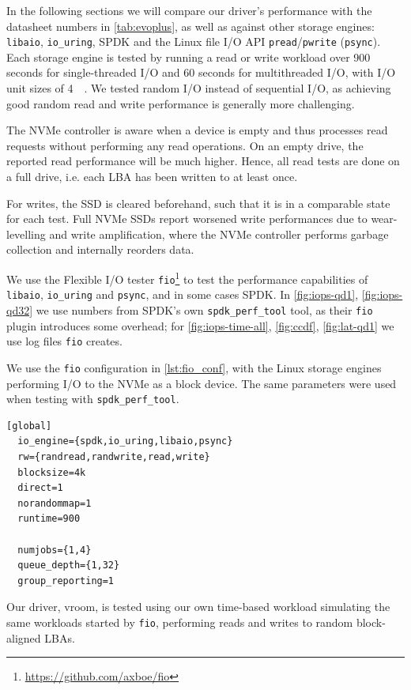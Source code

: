 In the following sections we will compare our driver's performance with the datasheet numbers in \autoref{tab:evoplus}, as well as against other storage engines: \texttt{libaio}, \texttt{io\_uring}, SPDK and the Linux file I/O API \texttt{pread}/\texttt{pwrite} (\texttt{psync}). Each storage engine is tested by running a read or write workload over 900 seconds for single-threaded I/O and 60 seconds for multithreaded I/O, with I/O unit sizes of \qty{4}{\kibi\byte}. We tested random I/O instead of sequential I/O, as achieving good random read and write performance is generally more challenging.

The NVMe controller is aware when a device is empty and thus processes read requests without performing any read operations. On an empty drive, the reported read performance will be much higher. Hence, all read tests are done on a full drive, i.e. each LBA has been written to at least once.

For writes, the SSD is cleared beforehand, such that it is in a comparable state for each test. Full NVMe SSDs report worsened write performances due to wear-levelling and write amplification, where the NVMe controller performs garbage collection and internally reorders data.


  We use the Flexible I/O tester \texttt{fio}\footnote{\url{https://github.com/axboe/fio}} to test the performance capabilities of \texttt{libaio}, \texttt{io\_uring} and \texttt{psync}, and in some cases SPDK. In \autoref{fig:iops-qd1}, \autoref{fig:iops-qd32} we use numbers from SPDK's own \texttt{spdk\_perf\_tool} tool, as their \texttt{fio} plugin introduces some overhead; for \autoref{fig:iops-time-all}, \autoref{fig:ccdf}, \autoref{fig:lat-qd1} we use log files \texttt{fio} creates.

We use the \texttt{fio} configuration in \autoref{lst:fio_conf}, with the Linux storage engines performing I/O to the NVMe as a block device. The same parameters were used when testing with \texttt{spdk\_perf\_tool}.

\begin{lstlisting}[float, label=lst:fio_conf, caption=\texttt{fio} configuration]
  [global]
  io_engine={spdk,io_uring,libaio,psync}
  rw={randread,randwrite,read,write}
  blocksize=4k
  direct=1
  norandommap=1
  runtime=900

  numjobs={1,4}
  queue_depth={1,32}
  group_reporting=1
\end{lstlisting}

Our driver, vroom, is tested using our own time-based workload simulating the same workloads started by \texttt{fio}, performing reads and writes to random block-aligned LBAs.

